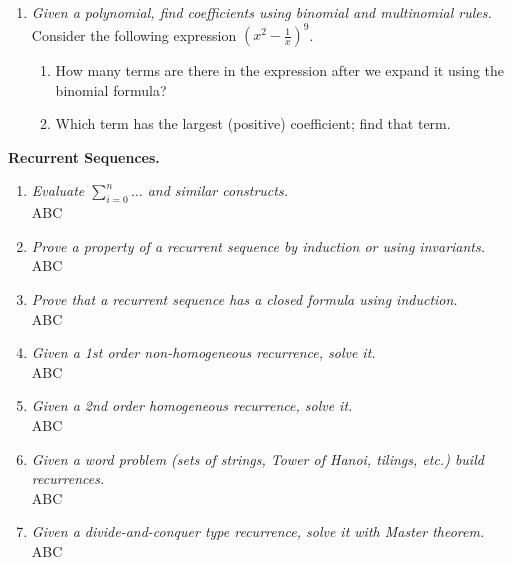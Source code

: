 \documentclass[a4paper,12pt]{article}
\begin{document}
\begin{enumerate}
\item {\small \em Given a polynomial, find coefficients using binomial and multinomial rules.}\\
Consider the following expression ${\displaystyle \left(x^2 - \frac{1}{x}\right)^{9}}$. 
\begin{enumerate}
\item
How many terms are there in the expression  after we expand it using the binomial formula?
\item 
Which term has the largest (positive) coefficient; find that term.
\end{enumerate}
\end{enumerate}





\vspace{10pt}
{\bf Recurrent Sequences.}

\begin{enumerate}
\item {\small \em Evaluate $\sum\limits_{i=0}^n \ldots$ and similar constructs.}\\
ABC

\item {\small \em Prove a property of a recurrent sequence by induction or using invariants.}\\
ABC

\item {\small \em Prove that a recurrent sequence has a closed formula using induction.}\\
ABC

\item {\small \em Given a 1st order non-homogeneous recurrence, solve it.}\\
ABC

\item {\small \em Given a 2nd order homogeneous recurrence, solve it.}\\
ABC

\item {\small \em Given a word problem (sets of strings, Tower of Hanoi, tilings, etc.) build recurrences.}\\
ABC

\item {\small \em Given a divide-and-conquer type recurrence, solve it with Master theorem.}\\
ABC
\end{enumerate}
\end{document}
